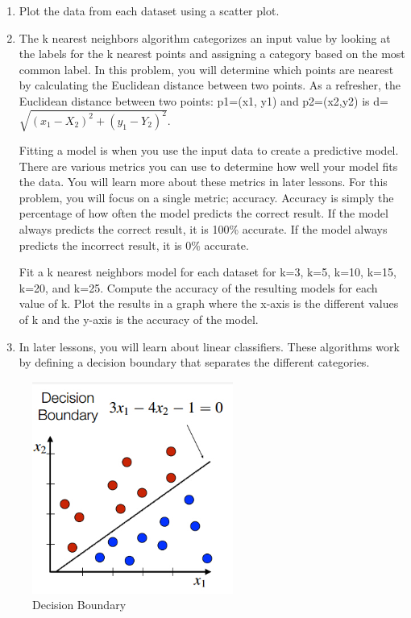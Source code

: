 \documentclass[
]{article}
\begin{document}
\begin{enumerate}
\def\labelenumi{\alph{enumi}.}
\item
  Plot the data from each dataset using a scatter plot.
\item
  The k nearest neighbors algorithm categorizes an input value by
  looking at the labels for the k nearest points and assigning a
  category based on the most common label. In this problem, you will
  determine which points are nearest by calculating the Euclidean
  distance between two points. As a refresher, the Euclidean distance
  between two points: p1=(x1, y1) and p2=(x2,y2) is
  d=\(\sqrt{(x_1 - X_2)^2 + (y_1 - Y_2)^2}\).

  Fitting a model is when you use the input data to create a predictive
  model. There are various metrics you can use to determine how well
  your model fits the data. You will learn more about these metrics in
  later lessons. For this problem, you will focus on a single metric;
  accuracy. Accuracy is simply the percentage of how often the model
  predicts the correct result. If the model always predicts the correct
  result, it is 100\% accurate. If the model always predicts the
  incorrect result, it is 0\% accurate.

  Fit a k nearest neighbors model for each dataset for k=3, k=5, k=10,
  k=15, k=20, and k=25. Compute the accuracy of the resulting models for
  each value of k. Plot the results in a graph where the x-axis is the
  different values of k and the y-axis is the accuracy of the model.
\item
  In later lessons, you will learn about linear classifiers. These
  algorithms work by defining a decision boundary that separates the
  different categories.
\end{enumerate}

\begin{figure}
\centering
\includegraphics{DecisionBoundary.png}
\caption{Decision Boundary}
\end{figure}
\end{document}

